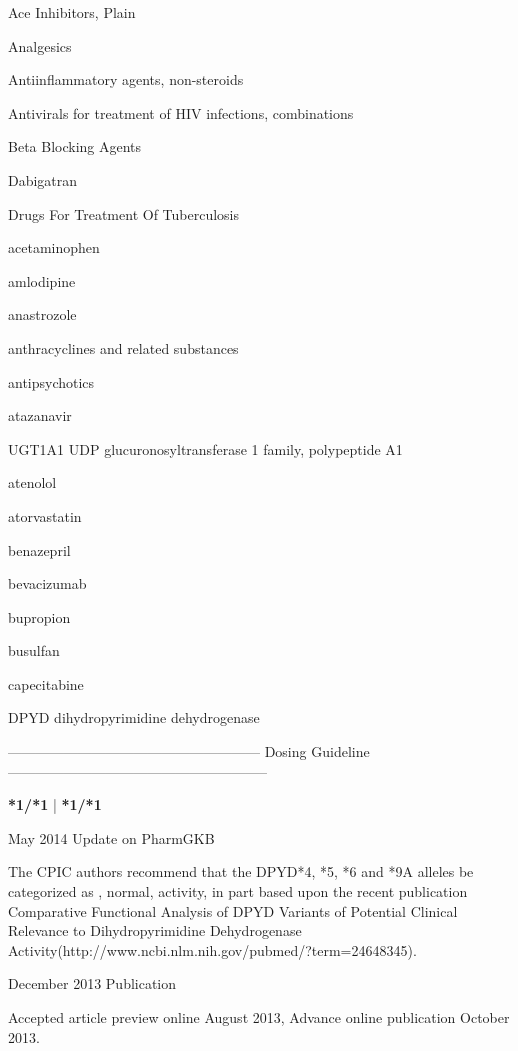 \documentclass{resume} %
\begin{document}
\begin{rSection}{ Ace Inhibitors, Plain }
\begin{rSection}{ Analgesics }
\begin{rSection}{ Antiinflammatory agents, non-steroids }
\begin{rSection}{ Antivirals for treatment of HIV infections, combinations }
\begin{rSection}{ Beta Blocking Agents }
\begin{rSection}{ Dabigatran }
\begin{rSection}{ Drugs For Treatment Of Tuberculosis }
\begin{rSection}{ acetaminophen }
\begin{rSection}{ amlodipine }
\begin{rSection}{ anastrozole }
\begin{rSection}{ anthracyclines and related substances }
\begin{rSection}{ antipsychotics }
\begin{rSection}{ atazanavir }
\begin{rSubsection}{ UGT1A1 }{ UDP glucuronosyltransferase 1 family, polypeptide A1 }{}{}
		\vspace{10pt}
		        

\end{rSubsection}
\end{rSection}\begin{rSection}{ atenolol }
\item[]
\begin{rSection}{ atorvastatin }
\item[]
\begin{rSection}{ benazepril }
\item[]
\begin{rSection}{ bevacizumab }
\item[]
\begin{rSection}{ bupropion }
\item[]
\begin{rSection}{ busulfan }
\item[]
\begin{rSection}{ capecitabine }
\item[]
\begin{rSubsection}{ DPYD }{ dihydropyrimidine dehydrogenase }{}{}
\item[]
\item[] ------------------------------------------------------ Dosing Guideline --------------------------------------------------------\newline
\item[]
\item[] \textbf{ *1/*1 } | \textbf{ *1/*1 }
\item May 2014 Update on PharmGKB
 \newline
\item The CPIC authors recommend that the DPYD*4, *5, *6 and *9A alleles be categorized as , normal,  activity, in part based upon the recent publication Comparative Functional Analysis of DPYD Variants of Potential Clinical Relevance to Dihydropyrimidine Dehydrogenase Activity(http://www.ncbi.nlm.nih.gov/pubmed/?term=24648345). 
 \newline
\item December 2013 Publication
 \newline
\item Accepted article preview online August 2013,  Advance online publication October 2013.
 \newline

\end{rSubsection}
\end{rSection}
\end{rSection}
\end{rSection}
\end{rSection}
\end{rSection}
\end{rSection}
\end{rSection}
\end{rSection}
\end{rSection}
\end{rSection}
\end{rSection}
\end{rSection}
\end{rSection}
\end{rSection}
\end{rSection}
\end{rSection}
\end{rSection}
\end{rSection}
\end{rSection}
\end{document}
